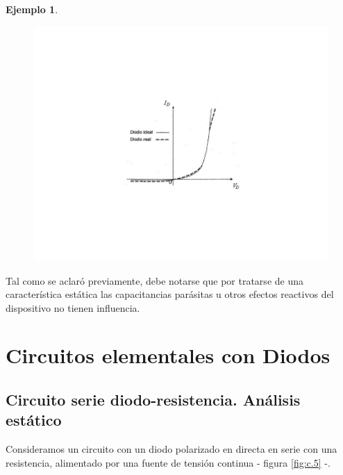 \documentclass{book} %
\theoremstyle{definition}
\newtheorem{exmp}{Ejemplo}[]
\theoremstyle{definition}
\begin{document}
\begin{appendices}
\begin{exmp}
\begin{figure}[!htbp]
    \centering
    \includegraphics[scale=1]{figurac04.pdf}
    \caption{}
    \label{fig:c.4}
\end{figure}

Tal como se aclaró previamente, debe notarse que por tratarse de una característica estática las capacitancias parásitas u otros efectos reactivos del dispositivo no tienen influencia.
\end{exmp}

\section{Circuitos elementales con Diodos}

\subsection{Circuito serie diodo-resistencia. Análisis estático}

Consideramos un circuito con un diodo polarizado en directa en serie con una resistencia, alimentado por una fuente de tensión continua - figura \ref{fig:c.5} -.


\end{appendices}
\end{document}
